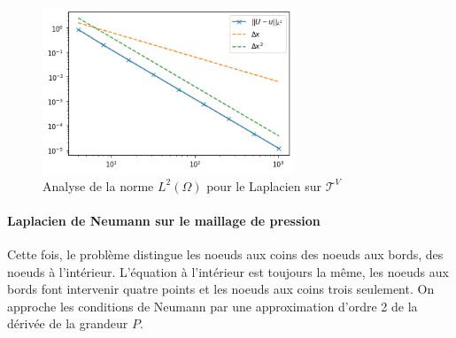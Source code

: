 \begin{figure}[htp]
    \centering
    \includegraphics[width=7.5cm]{Images/stokes/Laplace Dirichlet 2D (V)/analyse.png}
    \caption{Analyse de la norme $L^2(\Omega)$ pour le Laplacien sur $\mathcal{T}^V$}
\end{figure}

\newpage

\paragraph{Laplacien de Neumann sur le maillage de pression} Cette fois, le problème distingue les noeuds aux coins des noeuds aux bords, des noeuds à l'intérieur. L'équation à l'intérieur est toujours la même, les noeuds aux bords font intervenir quatre points et les noeuds aux coins trois seulement. On approche les conditions de Neumann par une approximation d'ordre 2 de la dérivée de la grandeur $P$.

